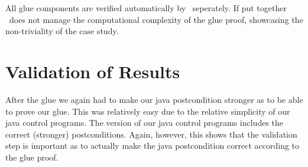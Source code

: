 All glue components are verified automatically by \keym~seperately. If put together \keym~does not manage the computational complexity of the glue proof, showcasing the non-triviality of the case study.

\section{Validation of Results}
\label{sec:traffic:val}

After the glue we again had to make our java postcondition stronger as to be able to prove our glue. This was relatively easy due to the relative simplicity of our java control programs. The version of our java control programs includes the correct (stronger) postconditions. Again, however, this shows that the validation step is important as to actually make the java postcondition correct according to the glue proof.
	